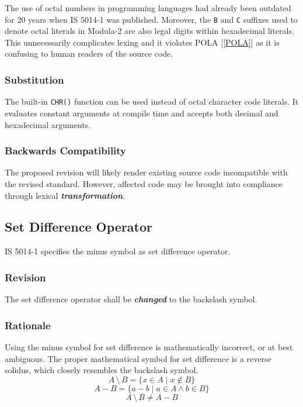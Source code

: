 \documentclass[10pt,a4paper,leqno,fleqn]{article}
\renewcommand{\emph}[1]{\textbf{\textit{#1}}}
\begin{document}
The use of octal numbers in programming languages had already been
outdated for 20 years when IS 5014-1 was published. Moreover, the \verb|B|
and \verb|C| suffixes used to denote octal literals in Modula-2 are also legal
digits within hexadecimal literals. This unnecessarily complicates lexing and
it violates POLA [\ref{POLA}] as it is confusing to human readers of the
source code. 

\subsubsection{Substitution}

The built-in \verb|CHR()| function can be used instead of octal character code
literals. It evaluates constant arguments at compile time and accepts both
decimal and hexadecimal arguments.

\subsubsection{Backwards Compatibility}

The proposed revision will likely render existing source code incompatible with
the revised standard. However, affected code may be brought into compliance
through lexical \emph{transformation}.

\subsection{Set Difference Operator}
\abovedisplayshortskip=0pt

IS 5014-1 specifies the minus symbol as set difference operator.

\subsubsection{Revision}
The set difference operator shall be \emph{changed} to the backslash symbol.

\subsubsection{Rationale}
Using the minus symbol for set difference is mathematically incorrect, or at best
ambiguous. The proper mathematical symbol for set difference is a reverse
solidus, which closely resembles the backslash symbol.
\begin{equation}
A \, \setminus \, B = \{ x \in A \mid x \notin B \}
\end{equation}
\begin{equation}
A-B = \{ a-b \mid a \in A \land b \in B \}
\end{equation}
\abovedisplayshortskip=4pt
\belowdisplayshortskip=10pt
\begin{equation}
A \, \setminus \, B \neq A-B
\end{equation}
\abovedisplayshortskip=0pt
\belowdisplayshortskip=0pt
\end{document}
